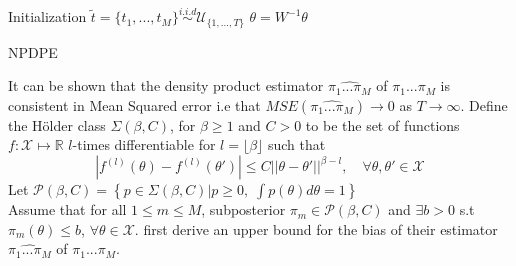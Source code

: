 \documentclass[11pt,a4paper]{report}\usepackage[]{graphicx}\usepackage[]{color}
\begin{document}
\begin{algorithm}[H]
\label{algo:neiswanger}
Initialization\;
$\tilde t=\{t_1,...,t_M\}\overset{i.i.d}{\sim}\mathcal{U}_{\{1,...,T\}}$\;
$\theta=W^{-1}\theta$
  \caption{NPDPE}
\end{algorithm}

It can be shown that the density product estimator $\widehat{\pi_1...\pi_M}$ of $\pi_1...\pi_M$ is consistent in Mean Squared error i.e that $MSE(\widehat{\pi_1...\pi_M})\longrightarrow0$ as $T\longrightarrow\infty$.
Define the H\"older class $\Sigma (\beta,C)$, for $\beta\geq1$ and $C>0$ to be the set of functions $f : \mathcal X\longmapsto\mathbb R$ $l$-times differentiable for $l=\lfloor\beta\rfloor$ such that
$$|f^{(l)}(\theta)-f^{(l)}(\theta')|\leq C||\theta-\theta'||^{\beta-l},\quad \forall \theta,\theta'\in\mathcal X$$
Let $\mathcal P(\beta,C)=\left\{p\in\Sigma(\beta,C)|p\geq0,\;\int p(\theta)d\theta=1\right\}$\\
Assume that for all $1\leq m\leq M$, subposterior $\pi_m\in\mathcal{P}(\beta,C)$ and $\exists b>0$ s.t $\pi_m(\theta)\leq b$, $\forall\theta\in\mathcal X$.
\cite{neiswanger2013asymptotically} first derive an upper bound for the bias of their estimator $\widehat{\pi_1...\pi_M}$ of $\pi_1...\pi_M$.\\
\end{document}
